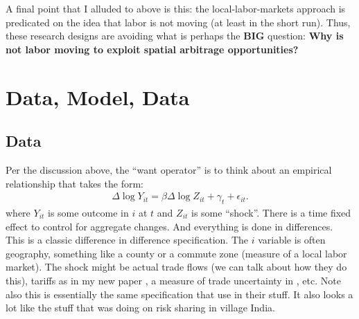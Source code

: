 \documentclass[pdftex,12pt]{article}
\begin{document}
\medskip
\noindent A final point that I alluded to above is this: the local-labor-markets approach is predicated on the idea that labor is not moving (at least in the short run). Thus, these research designs are avoiding what is perhaps the \textbf{BIG} question: \textbf{Why is not labor moving to exploit spatial arbitrage opportunities?}

\section{Data, Model, Data}

\subsection{Data}

Per the discussion above, the ``want operator'' is to think about an empirical relationship that takes the form:
\begin{align}
\Delta \log Y_{it} = \beta \Delta \log Z_{it} + \gamma_t + \epsilon_{it}.
\label{eq:adh_data_specification}
\end{align}
where $Y_{it}$ is some outcome in $i$ at $t$ and $Z_{it}$ is some ``shock''. There is a time fixed effect to control for aggregate changes. And everything is done in differences. This is a classic difference in difference specification. The $i$ variable is often geography, something like a county or a commute zone (measure of a local labor market). The shock might be actual trade flows (we can talk about how they do this), tariffs as in my new paper \citet{waugh_consumption}, a measure of trade uncertainty in \citet{pierce2016surprisingly}, etc. Note also this is essentially the same specification that \citet{mian2013household} use in their stuff. It also looks a lot like the stuff that \citet{townsend1994risk} was doing on risk sharing in village India.
\end{document}

